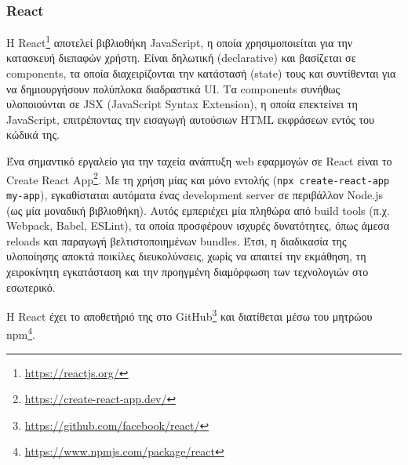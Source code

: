 \subsubsection{React} \label{subsection:4-2-2-1-react}


Η React\footnote{\url{https://reactjs.org/}} αποτελεί βιβλιοθήκη JavaScript, η οποία χρησιμοποιείται για την κατασκευή διεπαφών χρήστη. Είναι δηλωτική (declarative) και βασίζεται σε components, τα οποία διαχειρίζονται την κατάστασή (state) τους και συντίθενται για να δημιουργήσουν πολύπλοκα διαδραστικά UI. Τα components συνήθως υλοποιούνται σε JSX (JavaScript Syntax Extension), η οποία επεκτείνει τη JavaScript, επιτρέποντας την εισαγωγή αυτούσιων HTML εκφράσεων εντός του κώδικά της.

Ένα σημαντικό εργαλείο για την ταχεία ανάπτυξη web εφαρμογών σε React είναι το Create React App\footnote{\url{https://create-react-app.dev/}}. Με τη χρήση μίας και μόνο εντολής (\texttt{npx create-react-app my-app}), εγκαθίσταται αυτόματα ένας development server σε περιβάλλον Node.js (ως μία μοναδική βιβλιοθήκη). Αυτός εμπεριέχει μία πληθώρα από build tools (π.χ. Webpack, Babel, ESLint), τα οποία προσφέρουν ισχυρές δυνατότητες, όπως άμεσα reloads και παραγωγή βελτιστοποιημένων bundles. Έτσι, η διαδικασία της υλοποίησης αποκτά ποικίλες διευκολύνσεις, χωρίς να απαιτεί την εκμάθηση, τη χειροκίνητη εγκατάσταση και την προηγμένη διαμόρφωση των τεχνολογιών στο εσωτερικό. 

Η React έχει το αποθετήριό της στο GitHub\footnote{\url{https://github.com/facebook/react/}} και διατίθεται μέσω του μητρώου npm\footnote{\url{https://www.npmjs.com/package/react}}.
